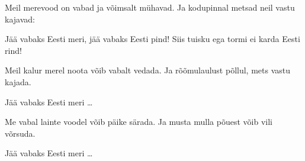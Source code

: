 Meil merevood on vabad ja v\~oimsalt m\"uhavad.
Ja kodupinnal metsad neil vastu kajavad:

J\"a\"a vabaks Eesti meri, j\"a\"a vabaks Eesti pind!
Siis tuisku ega tormi ei karda Eesti rind!

Meil kalur merel noota v\~oib vabalt vedada.
Ja r\~o\~omulaulust p\~ollul, mets vastu kajada.

J\"a\"a vabaks Eesti meri \ldots

Me vabal lainte voodel v\~oib p\"aike s\"arada.
Ja musta mulla p\~ouest v\~oib vili v\~orsuda.

J\"a\"a vabaks Eesti meri \ldots